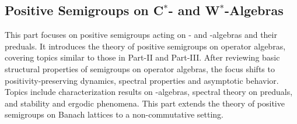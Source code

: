 \begin{partbacktext}
\part{Positive Semigroups on 
\texorpdfstring{C$^{*}$- and W$^{*}$-Algebras}{C*- and W*-Algebras}}
This part focuses on positive semigroups acting on \CA- and \WA-algebras and their preduals.
It introduces the theory of positive semigroups on operator algebras, covering topics similar to those in Part-II and Part-III.
After reviewing basic structural properties of semigroups on operator algebras, the focus shifts to positivity-preserving dynamics, spectral properties and asymptotic behavior.
Topics include characterization results on \WA-algebras, spectral theory on preduals, and stability and ergodic phenomena.
This part extends the theory of positive semigroups on Banach lattices to a non-commutative setting.
\end{partbacktext}
